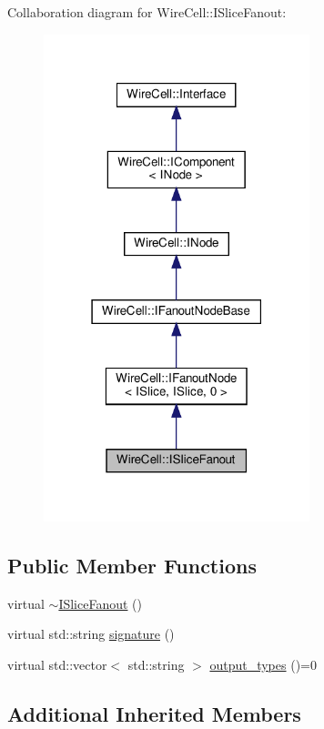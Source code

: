 Collaboration diagram for Wire\+Cell\+:\+:I\+Slice\+Fanout\+:
\nopagebreak
\begin{figure}[H]
\begin{center}
\leavevmode
\includegraphics[width=219pt]{class_wire_cell_1_1_i_slice_fanout__coll__graph}
\end{center}
\end{figure}
\subsection*{Public Member Functions}
\begin{DoxyCompactItemize}
\item 
virtual \hyperlink{class_wire_cell_1_1_i_slice_fanout_a7af6570c9d570417bcbe1c0e538bff7b}{$\sim$\+I\+Slice\+Fanout} ()
\item 
virtual std\+::string \hyperlink{class_wire_cell_1_1_i_slice_fanout_a7f2b90a58e2be888e25625e322f14c8d}{signature} ()
\item 
virtual std\+::vector$<$ std\+::string $>$ \hyperlink{class_wire_cell_1_1_i_slice_fanout_abde53bdfe0cef64ba3b05edcf111db65}{output\+\_\+types} ()=0
\end{DoxyCompactItemize}
\subsection*{Additional Inherited Members}


